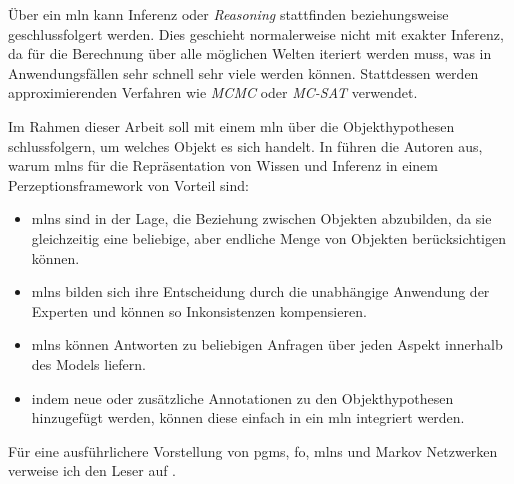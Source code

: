 Über ein \gls{mln} kann Inferenz oder \textit{Reasoning} stattfinden beziehungsweise geschlussfolgert werden. Dies geschieht normalerweise nicht mit exakter Inferenz, da für die Berechnung über alle möglichen Welten iteriert werden muss, was in Anwendungsfällen sehr schnell sehr viele werden können. Stattdessen werden approximierenden Verfahren wie \textit{MCMC} oder \textit{MC-SAT} verwendet. \cite{nyga17} \par  

Im Rahmen dieser Arbeit soll \robosherlock mit einem \gls{mln} über die Objekthypothesen schlussfolgern, um welches Objekt es sich handelt. In \cite{pr2looking} führen die Autoren aus, warum \glspl{mln} für die Repräsentation von Wissen und Inferenz in einem Perzeptionsframework von Vorteil sind: 
\begin{itemize}
	\item \glspl{mln} sind in der Lage, die Beziehung zwischen Objekten abzubilden, da sie gleichzeitig eine beliebige, aber endliche Menge von Objekten berücksichtigen können.
	\item \glspl{mln} bilden sich ihre Entscheidung durch die unabhängige Anwendung der Experten und können so Inkonsistenzen kompensieren.
	\item \glspl{mln} können Antworten zu beliebigen Anfragen über jeden Aspekt innerhalb des Models liefern. 
	\item indem neue oder zusätzliche Annotationen zu den Objekthypothesen hinzugefügt werden, können diese einfach in ein \gls{mln} integriert werden.    
\end{itemize}   
Für eine ausführlichere Vorstellung von \glspl{pgm}, \gls{fo}, \glspl{mln} und Markov Netzwerken verweise ich den Leser auf \cite{jain, nyga17, mln}. \par 

